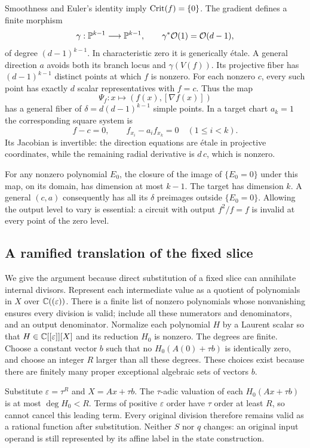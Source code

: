 Smoothness and Euler's identity imply $\operatorname{Crit}(f)=\{0\}$. The gradient
defines a finite morphism
\[
 \gamma:\mathbb P^{k-1}\longrightarrow\mathbb P^{k-1},\qquad
 \gamma^*\mathcal O(1)=\mathcal O(d-1),
\]
of degree $(d-1)^{k-1}$. In characteristic zero it is generically
\'{e}tale. A general direction $a$ avoids both its branch locus and
$\gamma(V(f))$. Its projective fiber has $(d-1)^{k-1}$ distinct
points at which $f$ is nonzero. For each nonzero $c$, every such point
has exactly $d$ scalar representatives with $f=c$. Thus the map
\[
 \Psi_f:x\longmapsto(f(x),[\nabla f(x)])
\]
has a general fiber of $\delta=d(d-1)^{k-1}$ simple points. In a target
chart $a_k=1$ the corresponding square system is
\begin{equation}\label{eq:levelpolar}
 f-c=0,\qquad f_{x_i}-a_i f_{x_k}=0\quad(1\le i<k).
\end{equation}
Its Jacobian is invertible: the direction equations are \'{e}tale in
projective coordinates, while the remaining radial derivative is
$d\,c$, which is nonzero.

For any nonzero polynomial $E_0$, the closure of the image of
$\{E_0=0\}$ under this map, on its domain, has dimension at most
$k-1$. The target has dimension $k$. A general $(c,a)$ consequently
has all its $\delta$ preimages outside $\{E_0=0\}$. Allowing the
output level to vary is essential: a circuit with output $f^2/f=f$
is invalid at every point of the zero level.

\subsection*{A ramified translation of the fixed slice}

We give the argument because direct substitution of a fixed slice
can annihilate internal divisors. Represent each intermediate value
as a quotient of polynomials in $X$ over $\mathbb C((\varepsilon))$.
There is a finite list of nonzero polynomials whose nonvanishing
ensures every division is valid; include all these numerators and
denominators, and an output denominator. Normalize each polynomial
$H$ by a Laurent scalar so that $H\in\mathbb C[[\varepsilon]][X]$ and its
reduction $H_0$ is nonzero. The degrees are finite. Choose a constant
vector $b$ such that no $H_0(A(0)+\tau b)$ is identically zero, and
choose an integer $R$ larger than all these degrees. These choices
exist because there are finitely many proper exceptional algebraic
sets of vectors $b$.

Substitute $\varepsilon=\tau^R$ and $X=Ax+\tau b$. The $\tau$-adic
valuation of each $H_0(Ax+\tau b)$ is at most $\deg H_0<R$.
Terms of positive $\varepsilon$ order have $\tau$ order at least
$R$, so cannot cancel this leading term. Every original division
therefore remains valid as a rational function after substitution.
Neither $S$ nor $q$ changes: an original input operand is still
represented by its affine label in the state construction.

